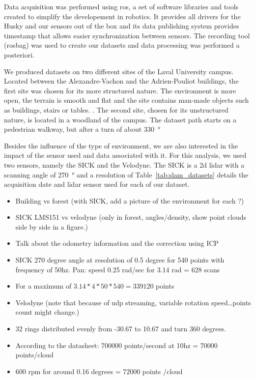 Data acquisition was performed using \gls{ros}, a set of software libraries and tools created to simplify the developement in robotics. It provides all drivers for the Husky and our sensors out of the box and its data publishing system provides timestamp that allows easier synchronization between sensors. The recording tool (rosbag) was used to create our datasets and data processing was performed a posteriori.

We produced datasets on two different sites of the Laval University campus. Located between the Alexandre-Vachon and the Adrien-Pouliot buildings, the first site was chosen for its more structured nature. The environment is more open, the terrain is smooth and flat and the site contains man-made objects such as buildings, stairs or tables. . The second site, chosen for its unstructured nature, is located in a woodland of the campus. The dataset path starts on a pedestrian walkway, but after a turn of about \SI{330}{\degree}

Besides the influence of the type of environment, we are also interested in the impact of the sensor used and data associated with it. For this analysis, we used two sensors, namely the SICK and the Velodyne. The SICK is a \gls{2d} \gls{lidar} with a scanning angle of \SI{270}{\degree} and a resolution of 
Table~\ref{tab:slam_datasets} details the acquisition date and \gls{lidar} sensor used for each of our dataset.

\begin{itemize}
    \item Building vs forest (with SICK, add a picture of the environment for each ?)
    \item SICK LMS151 vs velodyne (only in forest, angles/density, show point clouds side by side in a figure.)
    \item Talk about the odometry information and the correction using ICP
    \item SICK 270 degree angle at resolution of 0.5 degree for 540 points with frequency of 50hz. Pan: speed 0.25 rad/sec for 3.14 rad = 628 scans
    \item For a maximum of $3.14*4*50*540=339120$ points
    \item Velodyne (note that because of udp streaming, variable rotation speed\dots points count might change.)
    \item 32 rings distributed evenly from -30.67 to 10.67 and turn 360 degrees.
    \item According to the datasheet: 700000 points/second at 10hz = 70000 points/cloud
    \item 600 rpm for around 0.16 degrees = 72000 points /cloud
\end{itemize}

